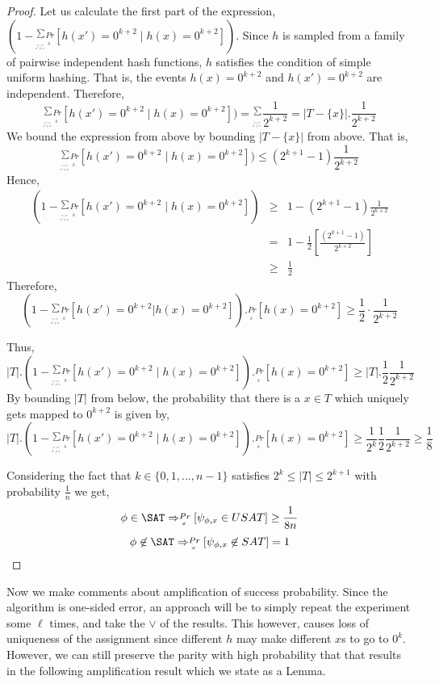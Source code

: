 \documentclass[11pt]{article}
\begin{document}
\begin{proof}
Let us calculate the first part of the expression, $(1-\stackrel{\sum}{_{_{_{_{\stackrel{x' \in T}{x' \neq x}}}}}}\stackrel{Pr}{_{_{_{h}}}}[h(x')=0^{k+2} \mid h(x)=0^{k+2}])$. Since $h$ is sampled from a family of pairwise independent hash functions, $h$ satisfies the condition of simple uniform hashing. That is, the events $h(x)=0^{k+2}$ and $h(x')=0^{k+2}$ are independent. Therefore,
\[
\stackrel{\sum}{_{_{_{_{\stackrel{x' \in T}{x' \neq x}}}}}}\stackrel{Pr}{_{_{_{h}}}}[h(x')=0^{k+2} \mid h(x)=0^{k+2}])=\stackrel{\sum}{_{_{_{_{\stackrel{x' \in T}{x' \neq x}}}}}}\frac{1}{2^{k+2}}= |T-\{x\}|.\frac{1}{2^{k+2}}
\]
We bound the expression from above by bounding $|T-\{x\}|$ from above. That is,
\[
\stackrel{\sum}{_{_{_{_{\stackrel{x' \in T}{x' \neq x}}}}}}\stackrel{Pr}{_{_{_{h}}}}[h(x')=0^{k+2}\mid h(x)=0^{k+2}]) \leq (2^{k+1}-1) \frac{1}{2^{k+2}}
\]
Hence, 
\begin{eqnarray*}
(1-\stackrel{\sum}{_{_{_{_{\stackrel{x' \in T}{x' \neq x}}}}}}\stackrel{Pr}{_{_{_{h}}}}[h(x')=0^{k+2}\mid h(x)=0^{k+2}]) 
& \geq & 1-(2^{k+1}-1)\frac{1}{2^{k+2}} \\
& = & 1-\frac{1}{2}[\frac{(2^{k+1}-1)}{2^{k+2}}] \\
& \geq & \frac{1}{2}
\end{eqnarray*}
Therefore, 
\[
(1-\stackrel{\sum}{_{_{_{_{\stackrel{x' \in T}{x' \neq x}}}}}}\stackrel{Pr}{_{_{_{h}}}}[h(x')=0^{k+2}|h(x)=0^{k+2}]).\stackrel{Pr}{_{_{_{h}}}}[h(x)=0^{k+2}]\geq \frac{1}{2}\cdot \frac{1}{2^{k+2}}
\]

Thus, 
\[
|T|.(1-\stackrel{\sum}{_{_{_{_{\stackrel{x' \in T}{x' \neq x}}}}}}\stackrel{Pr}{_{_{_{h}}}}[h(x')=0^{k+2}\mid h(x)=0^{k+2}]).\stackrel{Pr}{_{_{_{h}}}}[h(x)=0^{k+2}] \geq  |T|.\frac{1}{2}\frac{1}{2^{k+2}} 
\]
By bounding $|T|$ from below, the probability that there is a $x \in T$ which uniquely gets mapped to $0^{k+2}$ is given by,
\[
|T|.(1-\stackrel{\sum}{_{_{_{_{\stackrel{x' \in T}{x' \neq x}}}}}}\stackrel{Pr}{_{_{_{h}}}}[h(x')=0^{k+2}\mid h(x)=0^{k+2}]).\stackrel{Pr}{_{_{_{h}}}}[h(x)=0^{k+2}]\geq\frac{1}{2^{k}}\frac{1}{2}\frac{1}{2^{k+2}} \geq \frac{1}{8}
\]

Considering the fact that $k \in \{0,1,...,n-1\}$ satisfies $2^k \leq |T| \leq 2^{k+1}$ with probability $\frac{1}{n}$ we get,
\[
\phi \in \SAT \implies \stackrel{Pr}{_{_{_{x}}}}[\psi_{\phi,x} \in USAT] \geq \frac{1}{8n}
\]
\[
\phi \not\in \SAT \implies \stackrel{Pr}{_{_{_{x}}}}[\psi_{\phi,x} \not\in SAT] = 1
\]
\end{proof}

Now we make comments about amplification of success probability. Since the algorithm is one-sided error, an approach will be to simply repeat the experiment some $\ell$ times, and take the $\lor$ of the results. This however, causes loss of uniqueness of the assignment since different $h$ may make different $x$s to go to $0^k$. However, we can still preserve the parity with high probability that that results in the following amplification result which we state as a Lemma.
\end{document}
